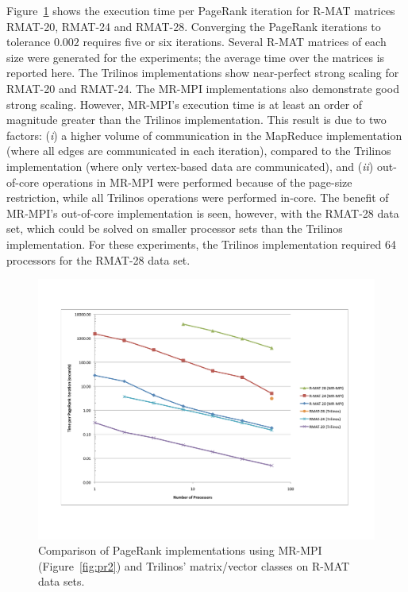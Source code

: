 Figure~\ref{f:pr} shows the execution time per PageRank iteration for
R-MAT matrices RMAT-20, RMAT-24 and RMAT-28.  
Converging the PageRank iterations
to tolerance $0.002$ requires five or six iterations.
Several R-MAT matrices of 
each size were generated for the experiments; the average time over the
matrices is reported here.  
The Trilinos implementations show near-perfect
strong scaling for RMAT-20 and RMAT-24.  The MR-MPI 
implementations also demonstrate good strong scaling.  However, MR-MPI's
execution time is at least an order of magnitude greater than the Trilinos
implementation.  This result is due to two factors:  ({\it i}) a 
higher volume of
communication in the MapReduce implementation (where all edges are communicated
in each iteration), compared to the Trilinos implementation (where only
vertex-based data are communicated), and ({\it ii}) out-of-core operations
in MR-MPI were performed because of the page-size restriction, while all
Trilinos operations were performed in-core.  The benefit of MR-MPI's
out-of-core implementation is seen, however, with the RMAT-28 data set, 
which could be solved on smaller processor sets than the Trilinos 
implementation.  For these experiments, the Trilinos implementation required
64 processors for the RMAT-28 data set. 


\begin{figure}[htb]
\includegraphics[width=\textwidth]{fig_pagerank.pdf}
\caption{Comparison of PageRank implementations using 
MR-MPI (Figure~\ref{fig:pr2}) and 
Trilinos' matrix/vector classes on R-MAT data sets.}
\label{f:pr}
\end{figure}


